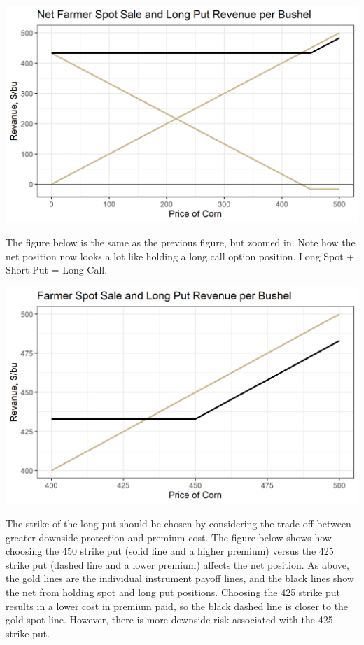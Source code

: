 \documentclass[
  letterpaper,
  DIV=11,
  numbers=noendperiod]{scrreprt}
\begin{document}
\includegraphics{assets/Options4-spotputcomb.png}

The figure below is the same as the previous figure, but zoomed in. Note
how the net position now looks a lot like holding a long call option
position. Long Spot + Short Put = Long Call.

\includegraphics{assets/Options4-spotputcombzoom.png}

The strike of the long put should be chosen by considering the trade off
between greater downside protection and premium cost. The figure below
shows how choosing the 450 strike put (solid line and a higher premium)
versus the 425 strike put (dashed line and a lower premium) affects the
net position. As above, the gold lines are the individual instrument
payoff lines, and the black lines show the net from holding spot and
long put positions. Choosing the 425 strike put results in a lower cost
in premium paid, so the black dashed line is closer to the gold spot
line. However, there is more downside risk associated with the 425
strike put.
\end{document}
